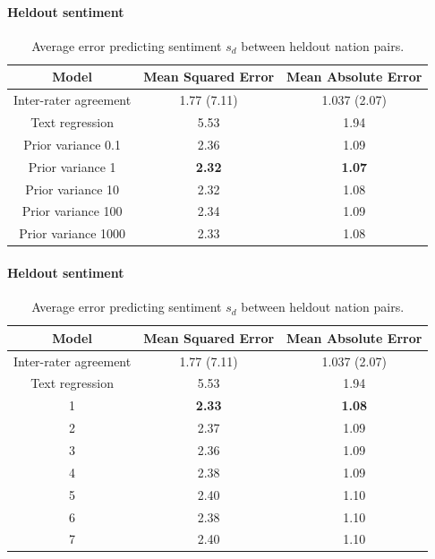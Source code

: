 \paragraph{Heldout sentiment}
 \begin{table}[t]
   \caption{Average error predicting sentiment $s_d$ between heldout nation pairs.}
   \begin{center}
   \begin{tabular}{|c|c|c|}
     \hline
     Model & Mean Squared Error & Mean Absolute Error \\
     \hline
     Inter-rater agreement & 1.77 (7.11) & 1.037 (2.07) \\
     \hline
     Text regression & 5.53 & 1.94 \\
     \hline
     Prior variance 0.1 & 2.36 & 1.09 \\
     Prior variance 1 & \textbf{2.32} & \textbf{1.07} \\
     Prior variance 10 & 2.32 & 1.08 \\
     Prior variance 100 & 2.34 & 1.09 \\
     Prior variance 1000 & 2.33 & 1.08 \\
     \hline
   \end{tabular}
   \label{figure:sse_test}
   \end{center}
\end{table}


\paragraph{Heldout sentiment}
 \begin{table}[t]
   \caption{Average error predicting sentiment $s_d$ between heldout nation pairs.}
   \begin{center}
   \begin{tabular}{|c|c|c|}
     \hline
     Model & Mean Squared Error & Mean Absolute Error \\
     \hline
     Inter-rater agreement & 1.77 (7.11) & 1.037 (2.07) \\
     \hline
     Text regression & 5.53 & 1.94 \\
     \hline
     1 & \textbf{2.33} & \textbf{1.08} \\
     2 & 2.37 & 1.09 \\
     3 & 2.36 & 1.09 \\
     4 & 2.38 & 1.09 \\
     5 & 2.40 & 1.10 \\
     6 & 2.38 & 1.10 \\
     7 & 2.40 & 1.10 \\
     \hline
   \end{tabular}
   \label{figure:sse_test}
   \end{center}
\end{table}

